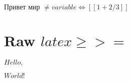 
\(\text{Привет }\allowbreak\text{мир }\allowbreak\neq variable \Leftrightarrow [[1 + 2 / 3]]\)

\section{Raw $latex \ge >=$}


\(Hello, \)\( World!\)



